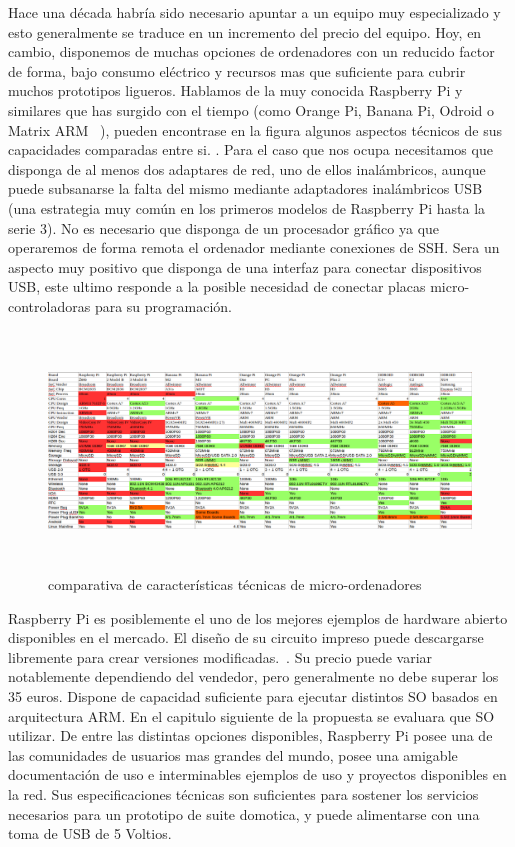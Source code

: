 \vspace{1.5cm}

Hace una década habría sido necesario apuntar a un equipo muy especializado y esto generalmente se traduce en un incremento del precio del equipo. Hoy, en cambio, disponemos de muchas opciones de ordenadores con un reducido factor de forma, bajo consumo eléctrico y recursos mas que suficiente para cubrir muchos prototipos ligueros. Hablamos de la muy conocida Raspberry Pi y similares que has surgido con el tiempo (como Orange Pi, Banana Pi, Odroid o Matrix ARM ~\cite{lignuxComparative}), pueden encontrase en la figura  algunos aspectos técnicos de sus capacidades comparadas entre si.
. Para el caso que nos ocupa necesitamos que disponga de al menos dos adaptares de red, uno de ellos inalámbricos, aunque puede subsanarse la falta del mismo mediante adaptadores inalámbricos USB (una estrategia muy común en los primeros modelos de Raspberry Pi hasta la serie 3). No es necesario que disponga de un procesador gráfico ya que operaremos de forma remota el ordenador mediante conexiones de SSH. Sera un aspecto muy positivo que disponga de una interfaz para conectar dispositivos USB, este ultimo responde a la posible necesidad de conectar placas micro-controladoras para su programación.

\begin{figure}[hbt!]
\centering
\includegraphics[height=2.5in]{figures/comparativaOrdenadores.png}
\caption[Comparativas de micro-ordenadores]{comparativa de características técnicas de micro-ordenadores\footnotemark}
\end{figure}


Raspberry Pi es posiblemente el uno de los mejores ejemplos de hardware abierto disponibles en el mercado. El diseño de su circuito impreso puede descargarse libremente para crear versiones modificadas.~\cite{raspberry_schematics}. Su precio puede variar notablemente dependiendo del vendedor, pero generalmente no debe superar los 35 euros. Dispone de capacidad suficiente para ejecutar distintos SO basados en arquitectura ARM. En el capitulo siguiente de la propuesta se evaluara que SO utilizar. De entre las distintas opciones disponibles, Raspberry Pi posee una de las comunidades de usuarios mas grandes del mundo, posee una amigable documentación de uso e interminables ejemplos de uso y proyectos disponibles en la red. Sus especificaciones técnicas son suficientes para sostener los servicios necesarios para un prototipo de suite domotica, y puede alimentarse con una toma de USB de 5 Voltios.

